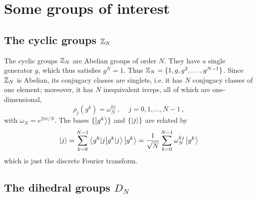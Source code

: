 \chapter{Some groups of interest}
\label{sec:some groups of interest}

\section{The cyclic groups \texorpdfstring{$\mathbb{Z}_N$}{ZN}}
\label{sec:ZN groups}

The cyclic groups $\mathbb{Z}_N$ are Abelian groups of order $N$.
They have a single generator $g$, which thus satisfies $g^N=1$.
Thus $\mathbb{Z}_N = \{1, g, g^2, \ldots, g^{N-1}\}$.
Since $\mathbb{Z}_N$ is Abelian, its conjugacy classes are singlets, i.e.
it has $N$ conjugacy classes of one element; moreover, it has $N$ inequivalent irreps, all of which are one-dimensional,
\begin{equation}
    \rho_j (g^k) = \omega_N^{kj}  \ , \,\,\,\,\,\,\, j = 0,1,\ldots, N-1 \ ,
\end{equation}
with $\omega_N= e^{2\pi i /N}$.
The bases $\{\ket{g^k}\}$ and $\{\ket{j}\}$ are related by
\begin{equation}
    \ket{j} = \sum_{k=0}^{N-1} \braket{g^k|j} \ket{g^k} = \frac{1}{\sqrt{N}}\sum_{k=0}^{N-1} \omega_N^{kj} \ket{g^k}
\end{equation}
which is just the discrete Fourier transform.


\section{The dihedral groups \texorpdfstring{$D_N$}{DN}}
\label{sec:DN groups}

